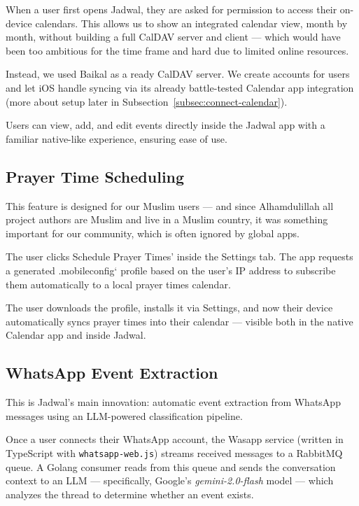 When a user first opens Jadwal, they are asked for permission to access their on-device calendars. This allows us to show an integrated calendar view, month by month, without building a full CalDAV server and client — which would have been too ambitious for the time frame and hard due to limited online resources.

Instead, we used Baikal as a ready CalDAV server. We create accounts for users and let iOS handle syncing via its already battle-tested Calendar app integration (more about setup later in Subsection~\ref{subsec:connect-calendar}).

Users can view, add, and edit events directly inside the Jadwal app with a familiar native-like experience, ensuring ease of use.

\subsection{Prayer Time Scheduling} \label{subsec:schedule-prayer-times}

This feature is designed for our Muslim users — and since Alhamdulillah all project authors are Muslim and live in a Muslim country, it was something important for our community, which is often ignored by global apps.

The user clicks Schedule Prayer Times' inside the Settings tab. The app requests a generated .mobileconfig` profile based on the user's IP address to subscribe them automatically to a local prayer times calendar.

The user downloads the profile, installs it via Settings, and now their device automatically syncs prayer times into their calendar — visible both in the native Calendar app and inside Jadwal.

\subsection{WhatsApp Event Extraction} \label{subsec:whatsapp-event-extraction}

This is Jadwal's main innovation: automatic event extraction from WhatsApp messages using an LLM-powered classification pipeline.

Once a user connects their WhatsApp account, the Wasapp service (written in TypeScript with \texttt{whatsapp-web.js}) streams received messages to a RabbitMQ queue. A Golang consumer reads from this queue and sends the conversation context to an LLM — specifically, Google’s \textit{gemini-2.0-flash} model — which analyzes the thread to determine whether an event exists.

